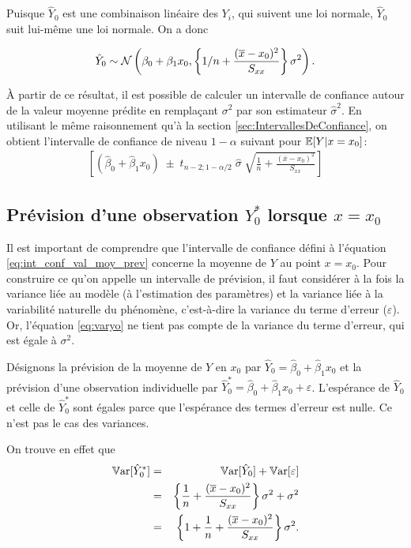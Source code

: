 Puisque $\hat{Y}_0$ est une combinaison linéaire des $Y_i$, qui suivent une loi normale, $\hat{Y}_0$ suit lui-même une loi normale. On a donc

\begin{equation}
\hat{Y}_0 \sim \mathcal{N}\left(\beta_0 + \beta_1 x_0, \left\{ 1/n + \frac{(\overline{x}-x_0)^2}{S_{xx}}\right\} \sigma^2 \right).
\end{equation}

À partir de ce résultat, il est possible de calculer un intervalle de confiance autour de la valeur moyenne prédite en remplaçant $\sigma^2$ par son estimateur $\hat\sigma^2$. En utilisant le même raisonnement qu'à la section \ref{sec:IntervallesDeConfiance}, on obtient l'intervalle de confiance de niveau $1-\alpha$ suivant pour $\mathbb{E}[Y|x=x_{0}]$:
\begin{eqnarray}
\left[(\hat{\beta}_0 + \hat{\beta}_1 x_0)\; \pm\; t_{n-2; 1-\alpha/2} \;\hat\sigma \; \sqrt{\frac{1}{n}+\frac{(\overline x-x_0)^2}{S_{xx}}}\right]
\label{eq:int_conf_val_moy_prev}
\end{eqnarray}

 \subsection{Prévision d'une observation $Y_0^*$ lorsque $x=x_0$}

Il est important de comprendre que l'intervalle de confiance défini à l'équation \eqref{eq:int_conf_val_moy_prev} concerne la moyenne de $Y$ au point $x=x_0$. Pour construire ce qu'on appelle un intervalle de prévision, il faut considérer à la fois la variance liée au modèle (à l'estimation des paramètres) et la variance liée à la variabilité naturelle du phénomène, c'est-à-dire la variance du terme d'erreur ($\varepsilon$). Or, l'équation \eqref{eq:varyo} ne tient pas compte de la variance du terme d'erreur, qui est égale à $\sigma^2$.

Désignons la prévision de la moyenne de $Y$ en  $x_0$ par $\hat{Y}_0 = \hat{\beta}_0 + \hat{\beta}_1 x_0$ et la prévision d'une observation individuelle par $\hat{Y}_0^* = \hat{\beta}_0 + \hat{\beta}_1 x_0 + \varepsilon$. L'espérance de $\hat{Y}_0$ et celle de $\hat{Y}_0^*$ sont égales parce que l'espérance des termes d'erreur est nulle. Ce n'est pas le cas des variances.

On trouve en effet que
\begin{eqnarray}
 \mathbb{V}\text{ar}[\hat{Y}_0^*] &=& \mathbb{V}\text{ar}[\hat{Y}_0] + \mathbb{V}\text{ar} [\varepsilon] \nonumber\\
 &=&\left\{ \frac{1}{n} + \frac{(\overline{x}-x_0)^2}{S_{xx}}\right\} \sigma^2 + \sigma^2 \nonumber\\
 &=& \left\{1+\frac{1}{n} + \frac{(\overline{x}-x_0)^2}{S_{xx}} \right\} \sigma^2.
 \label{eq:varyo*}
\end{eqnarray}

